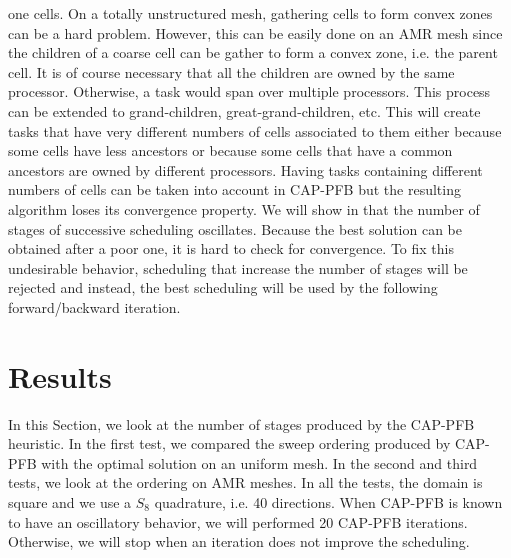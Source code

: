 \documentclass[letterpaper]{article}
\renewcommand{\(}{\left(}
\renewcommand{\)}{\right)}
\renewcommand{\[}{\left[}
\renewcommand{\]}{\right]}
\begin{document}
one cells. On a totally unstructured mesh, gathering cells to form convex zones
can be a hard problem. However, this can be easily done on an AMR mesh since the
children of a coarse cell can be gather to form a convex zone, i.e. the parent
cell. It is of course necessary that all the children are owned by the same
processor. Otherwise, a task would span over multiple processors. This process
can be extended to grand-children, great-grand-children, etc. This will create
tasks that have very different numbers of cells associated to them either
because some cells have less ancestors or because some cells that have a common
ancestors are owned by different processors. Having tasks containing different
numbers of cells can be  taken into account in CAP-PFB but the resulting
algorithm loses its convergence property. We will show in  that
the number of stages of successive scheduling oscillates. Because the best
solution can be obtained after a poor one, it is hard to check for convergence.
To fix this undesirable behavior, scheduling that increase the number of stages
will be rejected and instead, the best scheduling will be used by the following
forward/backward iteration.


\section{Results} \label{results}
In this Section, we look at the number of stages produced by the CAP-PFB
heuristic. In the first test, we compared the sweep ordering produced by CAP-PFB
with the optimal solution on an uniform mesh. In the second and third tests, we
look at the ordering on AMR meshes. In all the tests, the domain is square and
we use a $S_8$ quadrature, i.e. 40 directions. When CAP-PFB is known to have an
oscillatory behavior, we will performed 20 CAP-PFB iterations. Otherwise, we
will stop when an iteration does not improve the scheduling.
\end{document}
